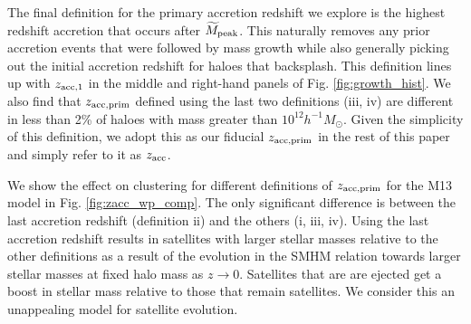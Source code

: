 \documentclass[useAMS,fleqn,usenatbib]{mnras}
\begin{document}
The final definition for the primary accretion redshift we explore is the highest redshift accretion that occurs after $\widetilde{M}_{\rm peak}$.  This naturally removes any prior accretion events that were followed by mass growth while also generally picking out the initial accretion redshift for haloes that backsplash.  This definition lines up with $z_{\rm acc, 1}$ in the middle and right-hand panels of Fig. \ref{fig:growth_hist}.  We also find that $z_{\rm acc, prim}$ defined using the last two definitions (iii, iv) are different in less than 2\% of haloes with mass greater than $10^{12}h^{-1}M_{\odot}$.  Given the simplicity of this definition, we adopt this as our fiducial $z_{\rm acc, prim}$ in the rest of this paper and simply refer to it as $z_{\rm acc}$. 

We show the effect on clustering for different definitions of $z_{\rm acc, prim}$ for the M13 model in Fig. \ref{fig:zacc_wp_comp}.  The only significant difference is between the last accretion redshift (definition ii) and the others (i, iii, iv).  Using the last accretion redshift results in satellites with larger stellar masses relative to the other definitions as a result of the evolution in the SMHM relation towards larger stellar masses at fixed halo mass as $z \rightarrow 0$.  Satellites that are are ejected get a boost in stellar mass relative to those that remain satellites.  We consider this an unappealing model for satellite evolution.
          
\end{document}
